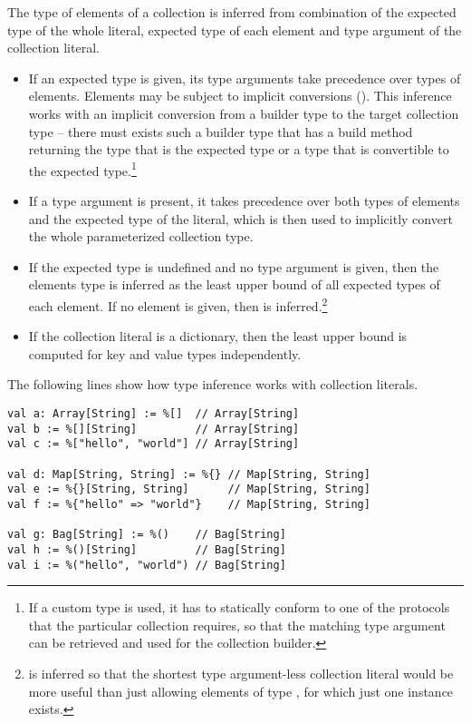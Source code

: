 The type of elements of a collection is inferred from combination of the expected type of the whole literal, expected type of each element and type argument of the collection literal. 
\begin{itemize}
  \item If an expected type is given, its type arguments take precedence over types of elements. Elements may be subject to implicit conversions (). This inference works with an implicit conversion from a builder type to the target collection type -- there must exists such a builder type that has a build method returning the type that is the expected type or a type that is convertible to the expected type.\footnote{If a custom type is used, it has to statically conform to one of the protocols that the particular collection requires, so that the matching type argument can be retrieved and used for the collection builder.} 
  \item If a type argument is present, it takes precedence over both types of elements and the expected type of the literal, which is then used to implicitly convert the whole parameterized collection type. 
  \item If the expected type is undefined and no type argument is given, then the elements type is inferred as the least upper bound of all expected types of each element. If no element is given, then  is inferred.\footnote{ is inferred so that the shortest type argument-less collection literal would be more useful than just allowing elements of type , for which just one instance exists.}
  \item If the collection literal is a dictionary, then the least upper bound is computed for key and value types independently.
\end{itemize}

\example The following lines show how type inference works with collection literals. 
\begin{lstlisting}
val a: Array[String] := %[]  // Array[String]
val b := %[][String]         // Array[String]
val c := %["hello", "world"] // Array[String]

val d: Map[String, String] := %{} // Map[String, String]
val e := %{}[String, String]      // Map[String, String]
val f := %{"hello" => "world"}    // Map[String, String]

val g: Bag[String] := %()    // Bag[String]
val h := %()[String]         // Bag[String]
val i := %("hello", "world") // Bag[String]
\end{lstlisting}






